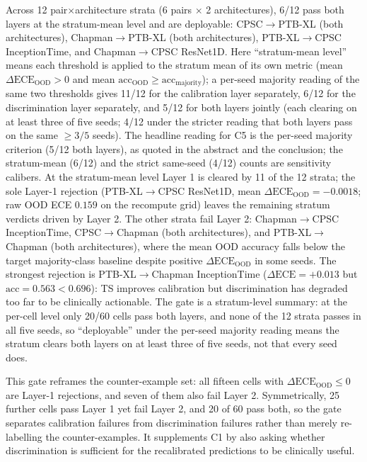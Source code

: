 \documentclass[final,5p,times,nonatbib]{elsarticle}
\begin{document}
Across 12 pair$\times$architecture strata (6 pairs $\times$ 2
architectures), 6/12 pass both layers at the stratum-mean level and are
deployable: CPSC$\rightarrow$PTB-XL (both architectures),
Chapman$\rightarrow$PTB-XL (both architectures),
PTB-XL$\rightarrow$CPSC InceptionTime, and Chapman$\rightarrow$CPSC
ResNet1D. Here ``stratum-mean level'' means
each threshold is applied to the stratum mean of its own metric (mean
$\Delta\text{ECE}_{\text{OOD}} > 0$ and mean
$\text{acc}_{\text{OOD}} \geq \text{acc}_{\text{majority}}$); a
per-seed majority reading of the same two thresholds gives 11/12 for
the calibration layer separately, 6/12 for the discrimination layer
separately, and 5/12 for both layers jointly (each clearing on at
least three of five seeds; 4/12 under the stricter reading that both
layers pass on the same $\geq 3/5$ seeds). The headline reading for
C5 is the per-seed majority criterion (5/12 both layers), as quoted in
the abstract and the conclusion; the stratum-mean (6/12) and the strict
same-seed (4/12) counts are sensitivity calibers. At the
stratum-mean level Layer 1 is cleared by 11 of the 12 strata; the sole
Layer-1 rejection (PTB-XL$\rightarrow$CPSC ResNet1D, mean
$\Delta\text{ECE}_{\text{OOD}}=-0.0018$; raw OOD ECE $0.159$ on the
recompute grid) leaves the remaining stratum verdicts driven by
Layer 2.
The other strata fail Layer 2:
Chapman$\rightarrow$CPSC InceptionTime,
CPSC$\rightarrow$Chapman (both architectures), and
PTB-XL$\rightarrow$Chapman (both architectures), where the mean OOD
accuracy falls below the target majority-class baseline despite positive
$\Delta\text{ECE}_{\text{OOD}}$ in some seeds. The strongest rejection
is PTB-XL$\rightarrow$Chapman InceptionTime ($\Delta\text{ECE}=+0.013$ but
$\text{acc}=0.563 < 0.696$): TS improves calibration but
discrimination has degraded too far to be clinically actionable. The
gate is a stratum-level summary: at the per-cell level only 20/60 cells
pass both layers, and none of the 12 strata passes in all five
seeds, so ``deployable'' under the per-seed majority reading means the
stratum clears both layers on at least three of five seeds, not
that every seed does.

This gate reframes the counter-example set: all fifteen cells with
$\Delta\text{ECE}_{\text{OOD}} \leq 0$ are Layer-1 rejections, and seven
of them also fail Layer 2. Symmetrically, 25 further cells pass Layer 1
yet fail Layer 2, and 20 of 60 pass both, so the gate separates
calibration failures from discrimination failures rather than merely
re-labelling the counter-examples. It supplements C1 by also asking
whether discrimination is sufficient for the recalibrated predictions
to be clinically useful.
\end{document}
